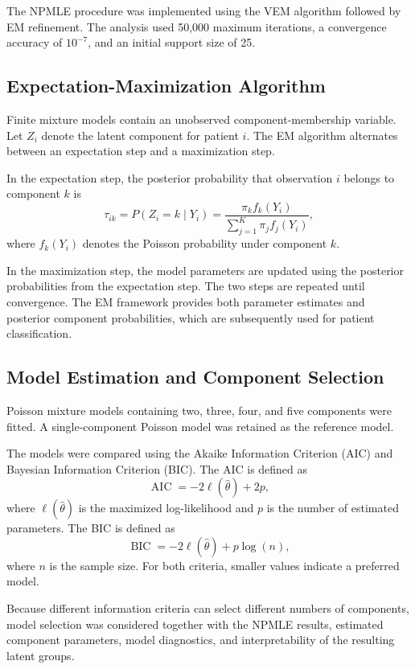 The NPMLE procedure was implemented using the VEM algorithm followed by EM refinement. The analysis used 50,000 maximum iterations, a convergence accuracy of $10^{-7}$, and an initial support size of 25.

\subsection{Expectation-Maximization Algorithm}

Finite mixture models contain an unobserved component-membership variable. Let $Z_i$ denote the latent component for patient $i$. The EM algorithm alternates between an expectation step and a maximization step.

In the expectation step, the posterior probability that observation $i$ belongs to component $k$ is
\[
\tau_{ik}=P(Z_i=k\mid Y_i)=\frac{\pi_k f_k(Y_i)}{\sum_{j=1}^{K}\pi_j f_j(Y_i)},
\]
where $f_k(Y_i)$ denotes the Poisson probability under component $k$.

In the maximization step, the model parameters are updated using the posterior probabilities from the expectation step. The two steps are repeated until convergence. The EM framework provides both parameter estimates and posterior component probabilities, which are subsequently used for patient classification.

\subsection{Model Estimation and Component Selection}

Poisson mixture models containing two, three, four, and five components were fitted. A single-component Poisson model was retained as the reference model.

The models were compared using the Akaike Information Criterion (AIC) and Bayesian Information Criterion (BIC). The AIC is defined as
\[
\operatorname{AIC}=-2\ell(\widehat{\theta})+2p,
\]
where $\ell(\widehat{\theta})$ is the maximized log-likelihood and $p$ is the number of estimated parameters. The BIC is defined as
\[
\operatorname{BIC}=-2\ell(\widehat{\theta})+p\log(n),
\]
where $n$ is the sample size. For both criteria, smaller values indicate a preferred model.

Because different information criteria can select different numbers of components, model selection was considered together with the NPMLE results, estimated component parameters, model diagnostics, and interpretability of the resulting latent groups.

